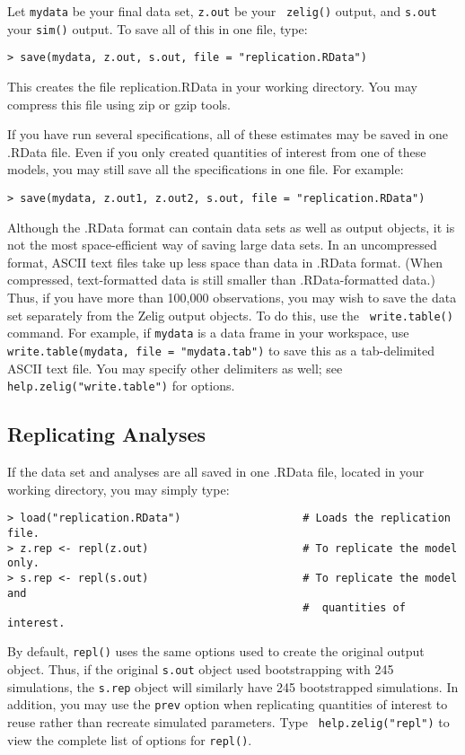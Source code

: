 Let {\tt mydata} be your final data set, {\tt z.out} be your {\tt
  zelig()} output, and {\tt s.out} your {\tt sim()} output.  To save
all of this in one file, type:
\begin{verbatim}
> save(mydata, z.out, s.out, file = "replication.RData")
\end{verbatim}
This creates the file replication.RData in your working directory.
You may compress this file using zip or gzip tools.

If you have run several specifications, all of these estimates may be
saved in one .RData file.  Even if you only created quantities of
interest from one of these models, you may still save all the
specifications in one file.  For example:
\begin{verbatim}
> save(mydata, z.out1, z.out2, s.out, file = "replication.RData")
\end{verbatim}

Although the .RData format can contain data sets as well as output
objects, it is not the most space-efficient way of saving large data
sets.  In an uncompressed format, ASCII text files take up less space
than data in .RData format.  (When compressed, text-formatted data is
still smaller than .RData-formatted data.)  Thus, if you have more
than 100,000 observations, you may wish to save the data set
separately from the Zelig output objects.  To do this, use the {\tt
  write.table()} command.  For example, if {\tt mydata} is a data
frame in your workspace, use {\tt write.table(mydata, file =
  "mydata.tab")} to save this as a tab-delimited ASCII text file.  You
may specify other delimiters as well; see {\tt
  help.zelig("write.table")} for options.

\subsection{Replicating Analyses}

If the data set and analyses are all saved in one .RData file, located
in your working directory, you may simply type:
\begin{verbatim}
> load("replication.RData")                   # Loads the replication file.  
> z.rep <- repl(z.out)                        # To replicate the model only. 
> s.rep <- repl(s.out)                        # To replicate the model and 
                                              #  quantities of interest.  
\end{verbatim}
By default, {\tt repl()} uses the same options used to create the
original output object.  Thus, if the original {\tt s.out} object used
bootstrapping with 245 simulations, the {\tt s.rep} object will
similarly have 245 bootstrapped simulations.  In addition, you may use
the {\tt prev} option when replicating quantities of interest to reuse
rather than recreate simulated parameters.  Type {\tt
  help.zelig("repl")} to view the complete list of options for
{\tt repl()}.

